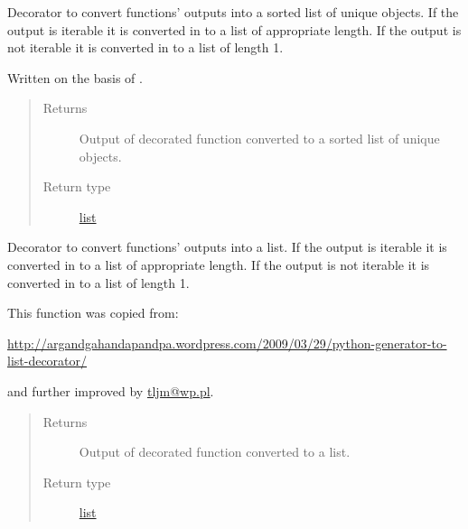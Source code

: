 \documentclass[a4paper,10pt,english]{sphinxmanual}
\begin{document}

\begin{fulllineitems}
\label{aqueduct.utils.helpers:aqueduct.utils.helpers.uniqify}
Decorator to convert functions' outputs into a sorted list of unique objects. If the output is iterable it is
converted in to a list of appropriate length. If the output is not iterable it is converted in to a list of length 1.

Written on the basis of {\hyperref[aqueduct.utils.helpers:aqueduct.utils.helpers.listify]{}}.
\begin{quote}\begin{description}
\item[{Returns}] \leavevmode
Output of decorated function converted to a sorted list of unique objects.

\item[{Return type}] \leavevmode
\href{http://docs.python.org/2/library/functions.html\#list}{list}

\end{description}\end{quote}

\end{fulllineitems}


\begin{fulllineitems}
\label{aqueduct.utils.helpers:aqueduct.utils.helpers.listify}
Decorator to convert functions' outputs into a list. If the output is iterable it is converted in to a list
of appropriate length. If the output is not iterable it is converted in to a list of length 1.

This function was copied from:

\url{http://argandgahandapandpa.wordpress.com/2009/03/29/python-generator-to-list-decorator/}

and further improved by \href{mailto:tljm@wp.pl}{tljm@wp.pl}.
\begin{quote}\begin{description}
\item[{Returns}] \leavevmode
Output of decorated function converted to a list.

\item[{Return type}] \leavevmode
\href{http://docs.python.org/2/library/functions.html\#list}{list}

\end{description}\end{quote}

\end{fulllineitems}
\end{document}
